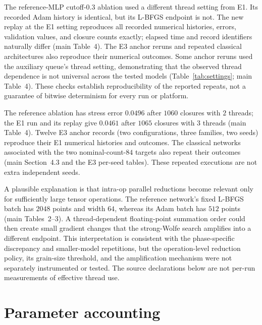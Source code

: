 \documentclass[11pt]{article}
\begin{document}
The reference-MLP cutoff-$0.3$ ablation used a different thread setting
from E1. Its recorded Adam history is identical, but its L-BFGS endpoint
is not. The new replay at the E1 setting reproduces all recorded numerical
histories, errors, validation values, and closure counts exactly; elapsed
time and record identifiers naturally differ (main Table~4).
The E3 anchor reruns and repeated classical architectures also reproduce
their numerical outcomes. Some anchor reruns used the auxiliary queue's
thread setting, demonstrating that the observed thread dependence is
not universal across the tested models (Table~\ref{tab:settings}; main Table~4). These checks establish reproducibility of the reported
repeats, not a guarantee of bitwise determinism for every run or platform.

The reference ablation has stress error $0.0496$ after $1060$ closures
with $2$ threads; the E1 run and its replay give $0.0461$ after $1065$
closures with $3$ threads (main Table~4). Twelve E3 anchor records
(two configurations, three families, two seeds) reproduce their E1
numerical histories and outcomes. The classical networks associated with
the two nominal-count-$84$ targets also repeat their outcomes (main
Section~4.3 and the E3 per-seed tables). These repeated executions are not
extra independent seeds.

A plausible explanation is that intra-op parallel reductions become
relevant only for sufficiently large tensor operations. The reference
network's fixed L-BFGS batch has $2048$ points and width $64$, whereas its
Adam batch has $512$ points (main Tables~2--3). A thread-dependent
floating-point summation order could then create small gradient changes
that the strong-Wolfe search amplifies into a different endpoint.
This interpretation is consistent with the phase-specific discrepancy
and smaller-model repetitions, but the operation-level reduction policy,
its grain-size threshold, and the amplification mechanism were not
separately instrumented or tested. The source declarations below are not
per-run measurements of effective thread use.

\section{Parameter accounting}
\end{document}
